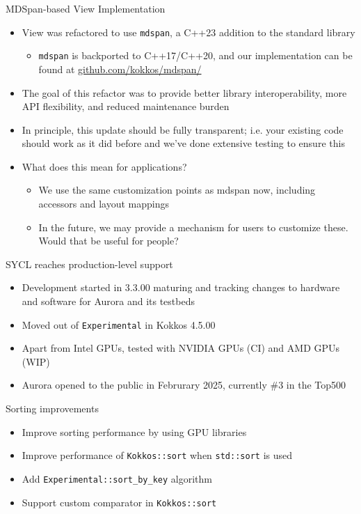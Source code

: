 \begin{frame}[fragile]{MDSpan-based View Implementation}
  \begin{itemize}
    \item View was refactored to use \texttt{mdspan}, a C++23 addition to the standard library
    \begin{itemize}
      \item \texttt{mdspan} is backported to C++17/C++20, and our implementation can be found at \url{github.com/kokkos/mdspan/}
    \end{itemize}
    \item The goal of this refactor was to provide better library interoperability, more API flexibility, and reduced maintenance burden
    \item In principle, this update should be fully transparent; i.e. your existing code should work as it did before and we've done extensive testing to ensure this
  \item What does this mean for applications?
  \begin{itemize}
    \item We use the same customization points as mdspan now, including accessors and layout mappings
    \item In the future, we may provide a mechanism for users to customize these. Would that be useful for people?
  \end{itemize}
  \end{itemize}
\end{frame}

\begin{frame}[fragile]{SYCL reaches production-level support}
  \begin{itemize}
    \item Development started in 3.3.00 maturing and tracking changes to hardware and software for Aurora and its testbeds
    \item Moved out of \texttt{Experimental} in Kokkos 4.5.00
    \item Apart from Intel GPUs, tested with NVIDIA GPUs (CI) and AMD GPUs (WIP)
    \item Aurora opened to the public in Februrary 2025, currently \#3 in the Top500
  \end{itemize}
\end{frame}

\begin{frame}[fragile]{Sorting improvements}
  \begin{itemize}
\item Improve sorting performance by using GPU libraries
\item Improve performance of \texttt{Kokkos::sort} when \texttt{std::sort} is used
\item Add \texttt{Experimental::sort\_by\_key} algorithm
\item Support custom comparator in \texttt{Kokkos::sort}
  \end{itemize}
\end{frame}

